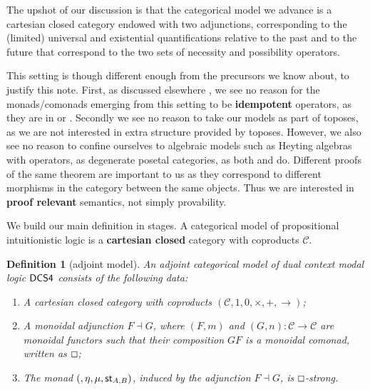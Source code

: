 \documentclass{article}
\let\Diamond\relax
\let\mto\to
\let\to\relax
\newcommand{\to}{\rightarrow}
\renewcommand{\Box}{\oblong}
\newcommand{\cat}[1]{\mathcal{#1}}
\newcommand{\pd}[0]{\times}
\newcommand{\ihom}[0]{\rightarrow}
\newcommand{\st}[2]{\mathsf{st}_{#1,#2}}
\newtheorem{definition}[theorem]{Definition}
\begin{document}
The upshot of our discussion is that the categorical model we advance is a cartesian closed category endowed with two adjunctions, corresponding to the (limited) universal and existential quantifications relative to the past and to the future that correspond to the two sets of  necessity and possibility operators.

This setting is though  different enough from the precursors we know about, to justify this note. First, as discussed elsewhere \cite{bierman2000}, we see no reason for the monads/comonads emerging from this setting to be \textbf{idempotent} operators, as they are in \cite{ghilardi1988} or \cite{makkai1995}. Secondly we see no reason to take our models as part of toposes, as we are not  interested in extra structure provided by toposes. 
However, we also see no reason to confine ourselves to algebraic models such as Heyting algebras with operators, as degenerate posetal categories, as both \cite{dziketal2012} and  \cite{Menni:2014} do. Different proofs of the same theorem are important to us as they correspond to different morphisms in the category between the same objects. Thus we are interested in \textbf{proof relevant} semantics, not simply provability.

We build our main definition in stages. A categorical model of propositional intuitionistic  logic is a \textbf{cartesian closed} category with coproducts $\cat{C}$.

\begin{definition}[adjoint model]
  \label{def:CS4-single-adjoint-cat-model}
  An adjoint categorical model of dual context modal logic $\sf{DCS4}$ consists of the following data:
  \begin{enumerate}
  \item A cartesian closed category with coproducts $(\cat{C},1,0,\pd,+,\ihom)$;
  \item 
    A monoidal adjunction  $F \dashv G$, where $(F,m)$ and  $(G,n)\colon \cat{C} \mto \cat{C}$ are monoidal functors such that their composition $GF$ is a monoidal comonad, written as $\Box$;
 \item The  monad $(\Diamond, \eta, \mu, \st{A}{B})$, induced by the adjunction $F \dashv G$,   is $\Box$-strong.
  \end{enumerate}
\end{definition}
\end{document}
